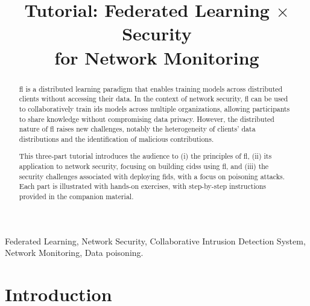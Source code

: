 \documentclass[conference]{IEEEtran}
\begin{document}
\title{Tutorial: Federated Learning $\times$ Security\\ for Network Monitoring}
\author{
\and
{}
}

\maketitle

\begin{abstract}
    \Gls{fl} is a distributed learning paradigm that enables training models across distributed clients without accessing their data.
    In the context of network security, \gls{fl} can be used to collaboratively train \gls{ids} models across multiple organizations, allowing participants to share knowledge without compromising data privacy.
    However, the distributed nature of \gls{fl} raises new challenges, notably the heterogeneity of clients' data distributions and the identification of malicious contributions.
    
    This three-part tutorial introduces the audience to (i) the principles of \gls{fl}, (ii) its application to network security, focusing on building \glspl{cids} using \gls{fl}, and (iii) the security challenges associated with deploying \gls{fids}, with a focus on poisoning attacks.
    Each part is illustrated with hands-on exercises, with step-by-step instructions provided in the companion material.
\end{abstract}

\glsresetall

\begin{IEEEkeywords}
Federated Learning, Network Security, Collaborative Intrusion Detection System, Network Monitoring, Data poisoning.
\end{IEEEkeywords}

\section{Introduction} %
\end{document}
